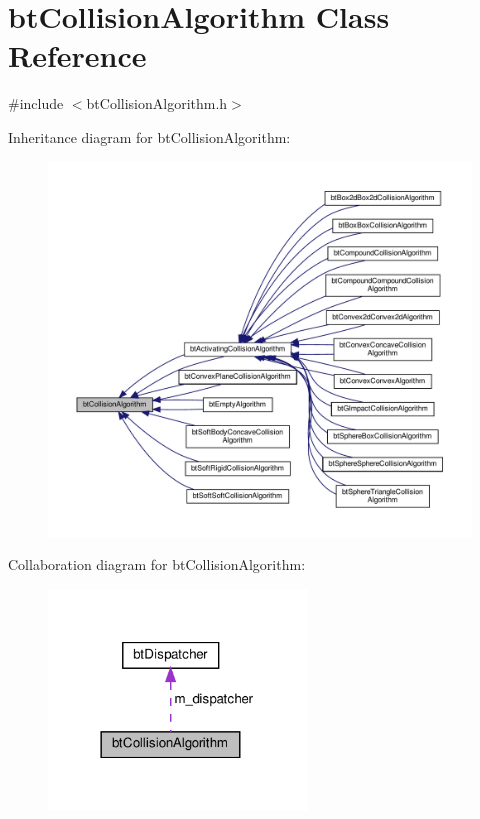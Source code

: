 \hypertarget{classbtCollisionAlgorithm}{}\section{bt\+Collision\+Algorithm Class Reference}
\label{classbtCollisionAlgorithm}


{\ttfamily \#include $<$bt\+Collision\+Algorithm.\+h$>$}



Inheritance diagram for bt\+Collision\+Algorithm\+:
\nopagebreak
\begin{figure}[H]
\begin{center}
\leavevmode
\includegraphics[width=350pt]{classbtCollisionAlgorithm__inherit__graph}
\end{center}
\end{figure}


Collaboration diagram for bt\+Collision\+Algorithm\+:
\nopagebreak
\begin{figure}[H]
\begin{center}
\leavevmode
\includegraphics[width=194pt]{classbtCollisionAlgorithm__coll__graph}
\end{center}
\end{figure}
